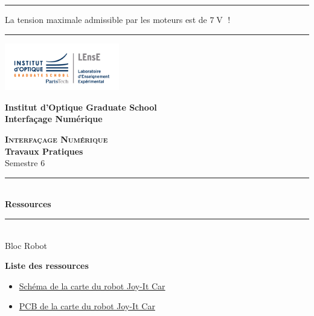 \documentclass[a4paper,11pt,titlepage]{article} %
\begin{document}
\noindent \rule{\linewidth}{1pt}

\bigskip

{\LARGE La tension maximale admissible par les moteurs est de $7\operatorname{V}$ !}

\bigskip

\noindent \rule{\linewidth}{1pt}



\newpage
\begin{center}
	\begin{minipage}{2.5cm}
	\begin{center}
		\includegraphics[width=5cm]{images/Logo-LEnsE.png}
	\end{center}
\end{minipage}\hfill
\begin{minipage}{10cm}
	\begin{center}
	\textbf{Institut d'Optique Graduate School }\\[0.1cm]
    \textbf{Interfaçage Numérique}


	\end{center}
\end{minipage}\hfill


\vspace{2cm}


{\Large \bfseries \textsc{Interfaçage Numérique}} \\[0.5cm]
{\large \bfseries Travaux Pratiques} \\[0.2cm]
Semestre 6

\vspace{1cm}

\rule{\linewidth}{0.4mm} \\[0.4cm]
{ \Large \bfseries\color{violet_iogs} Ressources \\[0.4cm] }
\rule{\linewidth}{0.4mm} \\[1cm]
{\large Bloc Robot}

\end{center}

\vspace{3cm}

\textbf{\large Liste des ressources}
\begin{itemize}
	\item \hyperref[doc:robot_schematic]{Schéma de la carte du robot Joy-It Car}
	\item \hyperref[doc:robot_pcb]{PCB de la carte du robot Joy-It Car}
\end{itemize}
\end{document}
